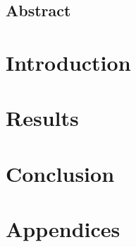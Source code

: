 \documentclass[12pt,a4paper,draft]{book}
\begin{document}
  
  \maketitle
  
  \chapter*{Abstract}
  
  \cleardoublepage
  \tableofcontents

  \part{Introduction}
  
  

  \part{Results}
  
  
  

  \part{Conclusion}
  

  \part*{Appendices}
  \appendix
  
  
  
  
  
  \cleardoublepage
  \nocite{*}
  \printbibliography[heading=bibintoc]

\end{document}
